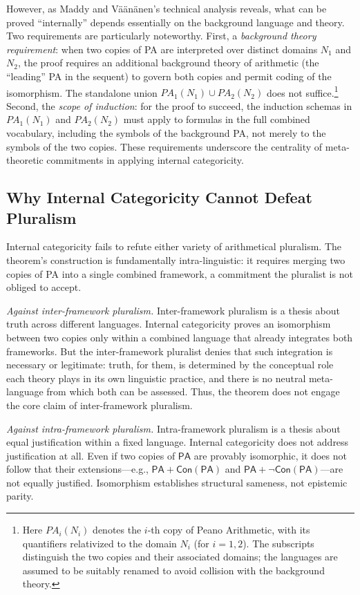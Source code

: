 \documentclass[a4paper,12pt]{amsart}
\theoremstyle{definition}
\numberwithin{equation}{section}
\begin{document}
However, as Maddy and V\"{a}\"{a}n\"{a}nen's technical analysis reveals, what can be proved ``internally'' depends essentially on the background language and theory. Two requirements are particularly noteworthy. First, a \emph{background theory requirement}: when two copies of {\sf PA} are interpreted over distinct domains $N_1$ and $N_2$, the proof requires an additional background theory of arithmetic (the ``leading'' {\sf PA} in the sequent) to govern both copies and permit coding of the isomorphism. The standalone union $PA_1(N_1) \cup PA_2(N_2)$ does not suffice.\footnote{Here \(PA_i(N_i)\) denotes the \(i\)-th copy of Peano Arithmetic, with its quantifiers relativized to the domain \(N_i\) (for \(i=1,2\)). The subscripts distinguish the two copies and their associated domains; the languages are assumed to be suitably renamed to avoid collision with the background theory.} Second, the \emph{scope of induction}: for the proof to succeed, the induction schemas in \(PA_{1}(N_{1})\) and \(PA_{2}(N_{2})\) must apply to formulas in the full combined vocabulary, including the symbols of the background {\sf PA}, not merely to the symbols of the two copies. These requirements underscore the centrality of meta-theoretic commitments in applying internal categoricity.
 
\subsection{Why Internal Categoricity Cannot Defeat Pluralism}
Internal categoricity fails to refute either variety of arithmetical pluralism. The theorem's construction is fundamentally intra-linguistic: it requires merging two copies of {\sf PA} into a single combined framework, a commitment the pluralist is not obliged to accept.
 
\emph{Against inter-framework pluralism.} Inter-framework pluralism is a thesis about truth across different languages. Internal categoricity proves an isomorphism between two copies only within a combined language that already integrates both frameworks. But the inter-framework pluralist denies that such integration is necessary or legitimate: truth, for them, is determined by the conceptual role each theory plays in its own linguistic practice, and there is no neutral meta-language from which both can be assessed. Thus, the theorem does not engage the core claim of inter-framework pluralism.

\emph{Against intra-framework pluralism.} Intra-framework pluralism is a thesis about equal justification within a fixed language. Internal 
categoricity does not address justification at all. Even if two copies 
of $\mathsf{PA}$ are provably isomorphic, it does not follow that their 
extensions---e.g., $\mathsf{PA}+\mathsf{Con}(\mathsf{PA})$ and 
$\mathsf{PA}+\neg\mathsf{Con}(\mathsf{PA})$---are not equally justified. 
Isomorphism establishes structural sameness, not epistemic parity.
 
\end{document}
